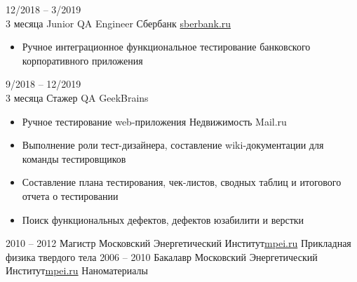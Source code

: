 \documentclass[10pt]{developercv} %
\begin{document}
\begin{entrylist}
	\entry
		{\small{12/2018 -- 3/2019}\\{\footnotesize{3 месяца}}}
		{Junior QA Engineer}
		{Сбербанк \slashsep \href{https://www.sberbank.ru}{sberbank.ru}}
		{
			\vspace{-\baselineskip}
			\begin{itemize}
				\setlength\itemsep{0pt}
				\setlength\itemindent{-\baselineskip}
				\item{Ручное интеграционное функциональное тестирование банковского 
					корпоративного приложения}
			\end{itemize}
		}
	\entry
		{\small{9/2018 -- 12/2019}\\{\footnotesize{3 месяца}}}
		{Стажер QA}
		{GeekBrains}
		{
			\vspace{-\baselineskip}
			\begin{itemize}
				\setlength\itemsep{0pt}
				\setlength\itemindent{-\baselineskip}
				\item{Ручное тестирование web-приложения Недвижимость Mail.ru}
				\item{Выполнение роли тест-дизайнера, составление wiki-документации для 
					команды тестировщиков}
				\item{Составление плана тестирования, чек-листов, 
					сводных таблиц и итогового отчета о тестировании}
				\item{Поиск функциональных дефектов, дефектов юзабилити и верстки}
			\end{itemize}
		}
\end{entrylist}



\begin{entrylist}
	\entry
		{\small{2010 -- 2012}}
		{Магистр}
		{Московский Энергетический Институт\slashsep \href{https://mpei.ru/}{mpei.ru}}
		{Прикладная физика твердого тела}
	\entry
		{\small{2006 -- 2010}}
		{Бакалавр}
		{Московский Энергетический Институт\slashsep \href{https://mpei.ru/}{mpei.ru}}
		{Наноматериалы}
\end{entrylist}

\end{document}
